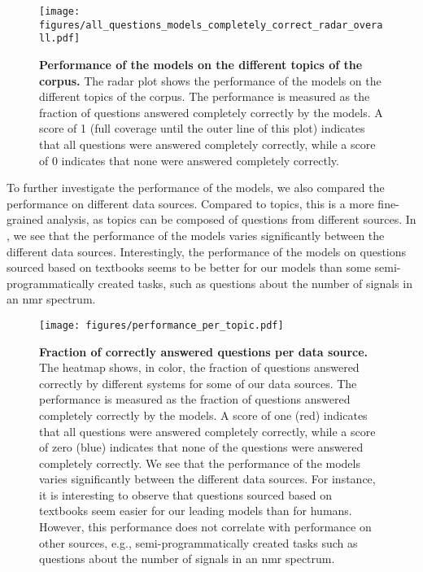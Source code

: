 \begin{figure}[htb]
    \centering
    \texttt{[image: figures/all\_questions\_models\_completely\_correct\_radar\_overall.pdf]}
    \caption{\textbf{Performance of the models on the different topics of the \chembench corpus.} The radar plot shows the performance of the models on the different topics of the \chembench corpus. The performance is measured as the fraction of questions answered completely correctly by the models.
    A score of 1 (full coverage until the outer line of this plot) indicates that all questions were answered completely correctly, while a score of 0 indicates that none were answered completely correctly.
    }
    \label{fig:all_questions_models_completely_correct_radar_overall}
\end{figure}


To further investigate the performance of the models, we also compared the performance on different data sources.
Compared to topics, this is a more fine-grained analysis, as topics can be composed of questions from different sources.
In , we see that the performance of the models varies significantly between the different data sources.
Interestingly, the performance of the models on questions sourced based on textbooks seems to be better for our models than some semi-programmatically created tasks, such as questions about the number of signals in an \gls{nmr} spectrum.


\begin{figure}[htb]
    \centering
    \texttt{[image: figures/performance\_per\_topic.pdf]}
    \caption{\textbf{Fraction of correctly answered questions per data source.} The heatmap shows, in color, the fraction of questions answered correctly by different systems for some of our data sources. The performance is measured as the fraction of questions answered completely correctly by the models. A score of one (red) indicates that all questions were answered completely correctly, while a score of zero (blue) indicates that none of the questions were answered completely correctly.
        We see that the performance of the models varies significantly between the different data sources. For instance, it is interesting to observe that questions sourced based on textbooks seem easier for our leading models than for humans. However, this performance does not correlate with performance on other sources, e.g., semi-programmatically created tasks such as questions about the number of signals in an \gls{nmr} spectrum.
    }
    \label{fig:performance_per_topic}
\end{figure}

